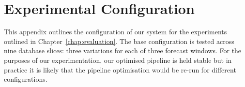 \chapter{Experimental Configuration}
\label{appendix:experimental_config}

This appendix outlines the configuration of our system for the experiments outlined in Chapter~\ref{chap:evaluation}. The base configuration is tested across nine database slices: three variations for each of three forecast windows. For the purposes of our experimentation, our optimised pipeline is held stable but in practice it is likely that the pipeline optimisation would be re-run for different configurations.

\newcommand{\one}[1]{\hspace{-2em}#1}
\newcommand{\two}[1]{\hspace{-1em}#1}

